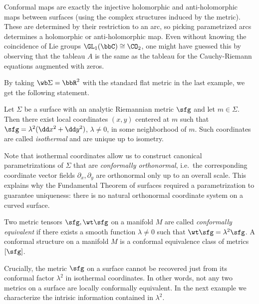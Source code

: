 \begin{example}
    Conformal maps are exactly the injective holomorphic and anti-holomorphic maps between surfaces (using the complex structures induced by the metric). These are determined by their restriction to an arc, so picking parametrized arcs determines a holomorphic or anti-holomorphic map. Even without knowing the coincidence of Lie groups $\GL_1(\bbC)\cong\CO_2$, one might have guessed this by observing that the tableau $A$ is the same as the tableau for the Cauchy-Riemann equations augmented with zeros.
\end{example}

By taking $\wb\Sigma=\bbR^2$ with the standard flat metric in the last example, we get the following statement.

\begin{cor}\label{cor isothermal coords}
    Let $\Sigma$ be a surface with an analytic Riemannian metric $\sfg$ and let $m\in\Sigma$. Then there exist local coordinates $(x,y)$ centered at $m$ such that $\sfg=\lambda^2(\dd x^2+\dd y^2)$, $\lambda\neq 0$, in some neighborhood of $m$. Such coordinates are called \emph{isothermal} and are unique up to isometry. 
\end{cor}

Note that isothermal coordinates allow us to construct canonical parametrizations of $\Sigma$ that are \emph{conformally orthonormal}, i.e.\ the corresponding coordinate vector fields $\partial_x,\partial_y$ are orthonormal only up to an overall scale. This explains why the Fundamental Theorem of surfaces required a parametrization to guarantee uniqueness: there is no natural orthonormal coordinate system on a curved surface.

\begin{defn}
    Two metric tensors $\sfg,\wt\sfg$ on a manifold $M$ are called \emph{conformally equivalent} if there exists a smooth function $\lambda\neq 0$ such that $\wt\sfg=\lambda^2 \sfg$. A conformal structure on a manifold $M$ is a conformal equivalence class of metrics $[\sfg]$.
\end{defn}

Crucially, the metric $\sfg$ on a surface cannot be recovered just from its conformal factor $\lambda^2$ in isothermal coordinates. In other words, not any two metrics on a surface are locally conformally equivalent. In the next example we characterize the intrisic information contained in $\lambda^2$.

